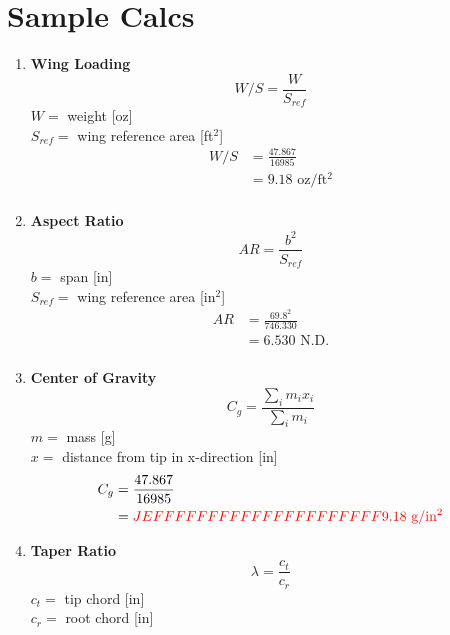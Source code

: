 \appendix
\renewcommand{\thesection}{\textbf{Appendix \Alph{section}:}}

\section{Sample Calcs} \label{apx:sample_calc}
\begin{enumerate}[wide,label=\textbf{\arabic*}., labelindent=0pt]

    \item \textbf{Wing Loading}
        \[W/S = \frac{W}{S_{ref}}\]
        $ W =$ weight [oz]\\
        $S_{ref} =$ wing reference area [ft$^2$]\\
        
        \begin{align*}
            W/S &= \frac{47.867}{16985}\\
            &= 9.18 \text{ oz/ft$^2$}\\
        \end{align*}
        
        \item \textbf{Aspect Ratio}
        \[AR = \frac{b^2}{S_{ref}}\]
        $ b =$ span [in]\\
        $S_{ref} =$ wing reference area [in$^2$]\\
        
        \begin{align*}
            AR &= \frac{69.8^2}{746.330}\\
            &= 6.530 \text{ N.D.}\\
        \end{align*}
    
    \item \textbf{Center of Gravity}
        \[C_g = \frac{\sum_i m_i x_i }{\sum_i m_i}\]
        $ m =$ mass [g]\\
        $ x =$ distance from tip in x-direction [in]\\
        
        \begin{align*}
            C_g &= \frac{47.867}{16985}\\
            &= \color{red}{JEFFFFFFFFFFFFFFFFFFFFF}9.18 \text{ g/in$^2$}\\
        \end{align*}
        
    \item \textbf{Taper Ratio}
        \[\lambda = \frac{c_t}{c_r}\]
        $ c_t =$ tip chord [in]\\
        $ c_r =$ root chord [in]\\
        

\end{enumerate}
